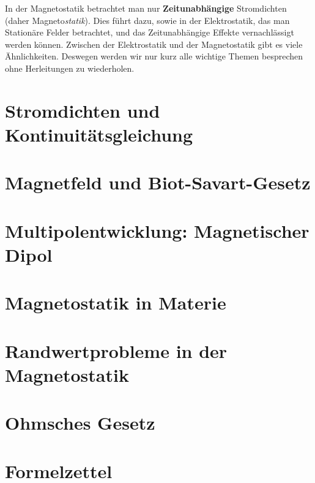In der Magnetostatik betrachtet man nur \textbf{Zeitunabhängige} Stromdichten (daher Magneto\textit{statik}). Dies führt dazu, sowie in der
Elektrostatik, das man Stationäre Felder betrachtet, und das Zeitunabhängige
Effekte vernachlässigt werden können. Zwischen der Elektrostatik und
der Magnetostatik gibt es viele Ähnlichkeiten. Deswegen werden wir nur
kurz alle wichtige Themen besprechen ohne Herleitungen zu wiederholen.

\section{Stromdichten und Kontinuitätsgleichung}%
\label{sec:stromdichten}


\newpage
\section{Magnetfeld und Biot-Savart-Gesetz}%
\label{sec:magnetfeld}


\newpage
\section{Multipolentwicklung: Magnetischer Dipol}%


\newpage
\section{Magnetostatik in Materie}%


\newpage
\section{Randwertprobleme in der Magnetostatik}%


\newpage
\section{Ohmsches Gesetz}%
\label{sec:ohmsches-gesetz}

\newpage
\section{Formelzettel}%
